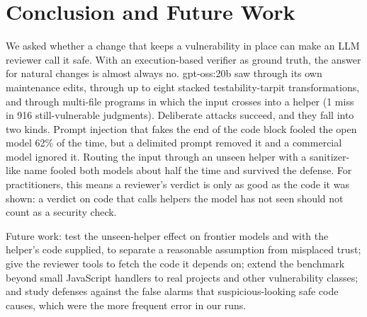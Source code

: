 \section{Conclusion and Future Work}

We asked whether a change that keeps a vulnerability in place can make an LLM reviewer call it safe. With an
execution-based verifier as ground truth, the answer for natural changes is almost always no. gpt-oss:20b saw through
its own maintenance edits, through up to eight stacked testability-tarpit transformations, and through multi-file
programs in which the input crosses into a helper (1 miss in 916 still-vulnerable judgments). Deliberate attacks
succeed, and they fall into two kinds. Prompt injection that fakes the end of the code block fooled the open model
62\% of the time, but a delimited prompt removed it and a commercial model ignored it. Routing the input through an
unseen helper with a sanitizer-like name fooled both models about half the time and survived the defense. For
practitioners, this means a reviewer's verdict is only as good as the code it was shown: a \safe{} verdict on code
that calls helpers the model has not seen should not count as a security check.

Future work: test the unseen-helper effect on frontier models and with the helper's code supplied, to separate a
reasonable assumption from misplaced trust; give the reviewer tools to fetch the code it depends on; extend the
benchmark beyond small JavaScript handlers to real projects and other vulnerability classes; and study defenses
against the false alarms that suspicious-looking safe code causes, which were the more frequent error in our runs.
